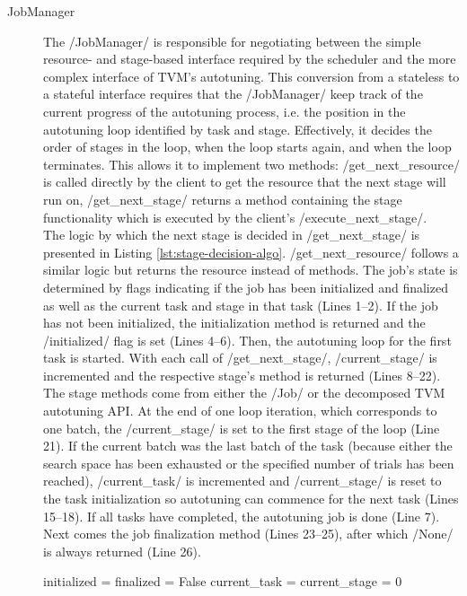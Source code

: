 \begin{description}
\begin{itemize}
	\end{itemize}
	\item[JobManager] The \pythoninline/JobManager/ is responsible for negotiating between the simple resource- and stage-based interface required by the scheduler and the more complex interface of TVM's autotuning. This conversion from a stateless to a stateful interface requires that the \pythoninline/JobManager/ keep track of the current progress of the autotuning process, i.e. the position in the autotuning loop identified by task and stage. Effectively, it decides the order of stages in the loop, when the loop starts again, and when the loop terminates. This allows it to implement two methods: \pythoninline/get_next_resource/ is called directly by the client to get the resource that the next stage will run on, \pythoninline/get_next_stage/ returns a method containing the stage functionality which is executed by the client's \pythoninline/execute_next_stage/.\\
	The logic by which the next stage is decided in \pythoninline/get_next_stage/ is presented in Listing \ref{lst:stage-decision-algo}. \pythoninline/get_next_resource/ follows a similar logic but returns the resource instead of methods. The job's state is determined by flags indicating if the job has been initialized and finalized as well as the current task and stage in that task (Lines 1--2). If the job has not been initialized, the initialization method is returned and the \pythoninline/initialized/ flag is set (Lines 4--6). Then, the autotuning loop for the first task is started. With each call of \pythoninline/get_next_stage/, \pythoninline/current_stage/ is incremented and the respective stage's method is returned (Lines 8--22). The stage methods come from either the \pythoninline/Job/ or the decomposed TVM autotuning API. At the end of one loop iteration, which corresponds to one batch, the \pythoninline/current_stage/ is set to the first stage of the loop (Line 21). If the current batch was the last batch of the task (because either the search space has been exhausted or the specified number of trials has been reached), \pythoninline/current_task/ is incremented and \pythoninline/current_stage/ is reset to the task initialization so autotuning can commence for the next task (Lines 15--18). If all tasks have completed, the autotuning job is done (Line 7). Next comes the job finalization method (Lines 23--25), after which \pythoninline/None/ is always returned (Line 26).
\begin{listing}[h]
\begin{pythoncode}
initialized = finalized = False
current_task = current_stage = 0


\end{pythoncode}
\end{listing}
\end{description}
